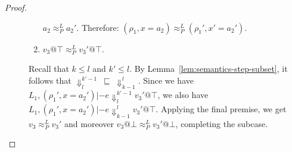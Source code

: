 \documentclass{article}
\makeatletter
\theoremstyle{definition}
\newcommand{\at}{\ensuremath{{\scriptstyle{@}}}}
\makeatother
\begin{document}
\begin{proof}
\begin{description}
\begin{enumerate}
      $a_2 \approx^{L}_{P} a_2'$.
      Therefore:
      $(\rho_1, x = a_2) \approx^{L}_{P} (\rho_1', x' = a_2')$.
    \item
      $v_3 \at \top \approx^{L}_{P} v_3' \at \top$.
    \end{enumerate}
    Recall that $k \leq l$ and $k' \leq l$.
    By Lemma~\ref{lem:semantics-step-subset}, it follows that
    $\Downarrow^{k'-1}_{l}\ \sqsubseteq\ \Downarrow^{l}_{k-1}$.
    Since we have
    $L_1, (\rho_1', x = a_2') |- e \Downarrow^{k'-1}_{l} v_3' \at \top$,
    we also have
    $L_1, (\rho_1', x = a_2') |- e \Downarrow^{l}_{k-1} v_3' \at \top$.
    Applying the final premise, we get $v_3 \approx^{L}_{P} v_3'$ and
    moreover $v_3 \at \bot \approx^{L}_{P} v_3' \at \bot$,
    completing the subcase.
    \qedhere
  \end{description}
\end{proof}
\end{document}
